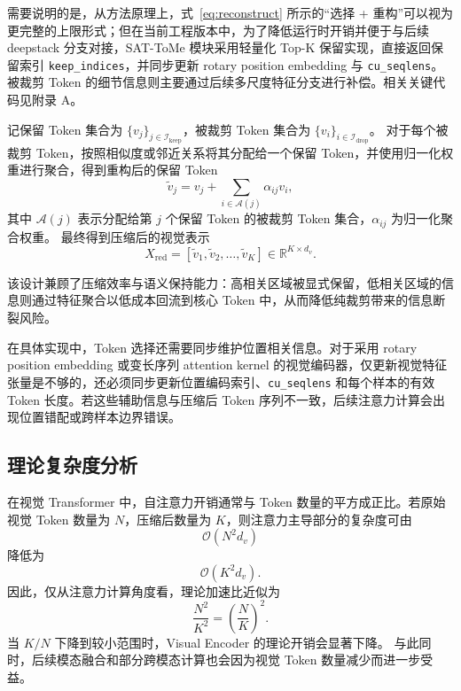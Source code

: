 需要说明的是，从方法原理上，式~\eqref{eq:reconstruct} 所示的“选择 + 重构”可以视为更完整的上限形式；但在当前工程版本中，为了降低运行时开销并便于与后续 deepstack 分支对接，SAT-ToMe 模块采用轻量化 Top-K 保留实现，直接返回保留索引 \texttt{keep\_indices}，并同步更新 rotary position embedding 与 \texttt{cu\_seqlens}。被裁剪 Token 的细节信息则主要通过后续多尺度特征分支进行补偿。相关关键代码见附录 A。

记保留 Token 集合为 $\{v_j\}_{j \in \mathcal{I}_{\mathrm{keep}}}$，被裁剪 Token 集合为 $\{v_i\}_{i \in \mathcal{I}_{\mathrm{drop}}}$。
对于每个被裁剪 Token，按照相似度或邻近关系将其分配给一个保留 Token，并使用归一化权重进行聚合，得到重构后的保留 Token
\begin{equation}
\tilde{v}_j = v_j + \sum_{i \in \mathcal{A}(j)} \alpha_{ij} v_i,
\label{eq:reconstruct}
\end{equation}
其中 $\mathcal{A}(j)$ 表示分配给第 $j$ 个保留 Token 的被裁剪 Token 集合，$\alpha_{ij}$ 为归一化聚合权重。
最终得到压缩后的视觉表示
\begin{equation}
X_{\mathrm{red}} = [\tilde{v}_1, \tilde{v}_2, \ldots, \tilde{v}_K] \in \mathbb{R}^{K \times d_v}.
\end{equation}

该设计兼顾了压缩效率与语义保持能力：高相关区域被显式保留，低相关区域的信息则通过特征聚合以低成本回流到核心 Token 中，从而降低纯裁剪带来的信息断裂风险。

在具体实现中，Token 选择还需要同步维护位置相关信息。对于采用 rotary position embedding 或变长序列 attention kernel 的视觉编码器，仅更新视觉特征张量是不够的，还必须同步更新位置编码索引、\texttt{cu\_seqlens} 和每个样本的有效 Token 长度。若这些辅助信息与压缩后 Token 序列不一致，后续注意力计算会出现位置错配或跨样本边界错误。

\subsection{理论复杂度分析}
在视觉 Transformer 中，自注意力开销通常与 Token 数量的平方成正比。若原始视觉 Token 数量为 $N$，压缩后数量为 $K$，则注意力主导部分的复杂度可由
\begin{equation}
\mathcal{O}(N^2 d_v)
\end{equation}
降低为
\begin{equation}
\mathcal{O}(K^2 d_v).
\end{equation}
因此，仅从注意力计算角度看，理论加速比近似为
\begin{equation}
\frac{N^2}{K^2} = \left(\frac{N}{K}\right)^2.
\end{equation}
当 $K/N$ 下降到较小范围时，Visual Encoder 的理论开销会显著下降。
与此同时，后续模态融合和部分跨模态计算也会因为视觉 Token 数量减少而进一步受益。


